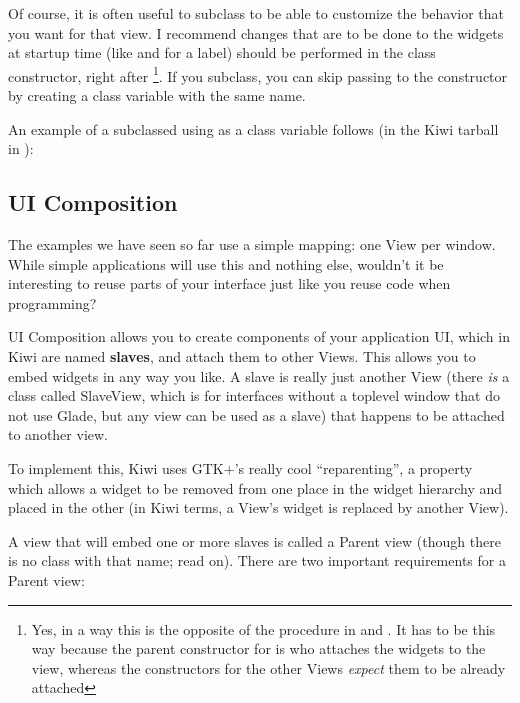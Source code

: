 \documentclass[a4paper]{howto}
\begin{document}


Of course, it is often useful to subclass  to be able to
customize the behavior that you want for that view. I recommend
changes that are to be done to the widgets at startup time (like
 and  for a label) should be
performed in the class constructor, right after
\footnote{Yes, in a way this is the
opposite of the procedure in  and . It
has to be this way because the parent constructor for 
is who attaches the widgets to the view, whereas the constructors for the
other Views {\it expect} them to be already attached}. If you subclass,
you can skip passing  to the constructor by creating a class
variable with the same name.

An example of a subclassed  using  as a
class variable follows (in the Kiwi tarball in
):



\subsection{UI Composition}

The examples we have seen so far use a simple mapping: one View per
window. While simple applications will use this and nothing else,
wouldn't it be interesting to reuse parts of your interface just like
you reuse code when programming?

UI Composition allows you to create components of your application UI,
which in Kiwi are named {\bf slaves}, and attach them to other Views.
This allows you to embed widgets in any way you like. A slave is really
just another View (there {\it is} a class called SlaveView, which is for
interfaces without a toplevel window that do not use Glade, but any view
can be used as a slave) that happens to be attached to another view.

To implement this, Kiwi uses GTK+'s really cool ``reparenting'', a
property which allows a widget to be removed from one place in the
widget hierarchy and placed in the other (in Kiwi terms, a View's widget
is replaced by another View).

A view that will embed one or more slaves is called a Parent view
(though there is no class with that name; read on). There are two
important requirements for a Parent view:
\end{document}

